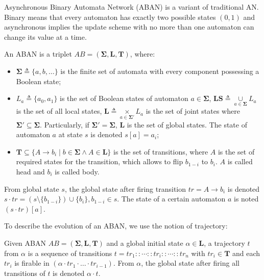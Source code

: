 \documentclass[runningheads]{llncs}
\begin{document}
Asynchronous Binary Automata Network (ABAN) is a variant of traditional AN.
Binary means that every automaton has exactly two possible states $(0,1)$ and asynchronous implies the update scheme with no more than one automaton can change its value at a time. 

\begin{definition}[ABAN]
An ABAN is a triplet $AB = (\mathbf{\Sigma},\mathbf{L},\mathbf{T})$, where:
\begin{itemize}
\item $\mathbf{\Sigma}\triangleq\{a,b,\ldots\}$ is the finite set of automata with every component possessing a Boolean state;
\item $L_a\triangleq\{a_0,a_1\}$ is the set of Boolean states of automaton $a\in \mathbf{\Sigma}$, $\mathbf{LS}\triangleq \underset{a\in \mathbf{\Sigma}}{\cup} L_a$ is the set of all local states,  $\mathbf{L}\triangleq \underset{a\in \mathbf{\Sigma'}}{\times} L_a$ is the set of joint states where $\mathbf{\Sigma'}\subseteq\mathbf{\Sigma}$. Particularly, if $\mathbf{\Sigma'}=\mathbf{\Sigma}$, $\mathbf{L}$ is the set of global states. 
The state of automaton $a$ at state $s$ is denoted $s[a]=a_i$;
\item $\mathbf{T}\subseteq \{A\to b_{i}\mid b\in \mathbf{\Sigma} \land A\in \mathbf{L}\}$ is the set of transitions, where $A$ is the set of required states for the transition, which allows to flip $b_{1-i}$ to $b_i$. $A$ is called head and $b_i$ is called body.
\end{itemize}
\end{definition}

\begin{definition}[Dynamics]
    From global state $s$, the global state after firing transition $tr=A\to b_i$ is denoted $s \cdot tr = (s \setminus \{b_{1-i}\}) \cup \{b_{i}\}, b_{1-i} \in s$.
    The state of a certain automaton $a$ is noted $(s\cdot tr)[a]$.
\end{definition}
To describe the evolution of an ABAN, we use the notion of trajectory:
\begin{definition}[Trajectory]
Given ABAN $AB = (\mathbf{\Sigma},\mathbf{L},\mathbf{T})$ and a global initial state $\alpha\in \mathbf{L}$, a trajectory $t$ from $\alpha$ is a sequence of transitions $t=tr_1::\cdots :: tr_i::\cdots ::tr_n$ with $tr_i\in\mathbf{T}$ and each $tr_i$ is firable in $(\alpha \cdot tr_1 \cdot \ldots \cdot tr_{i-1})$.
From $\alpha$, the global state after firing all transitions of $t$ is denoted $\alpha \cdot t$.
\end{definition}
\end{document}
